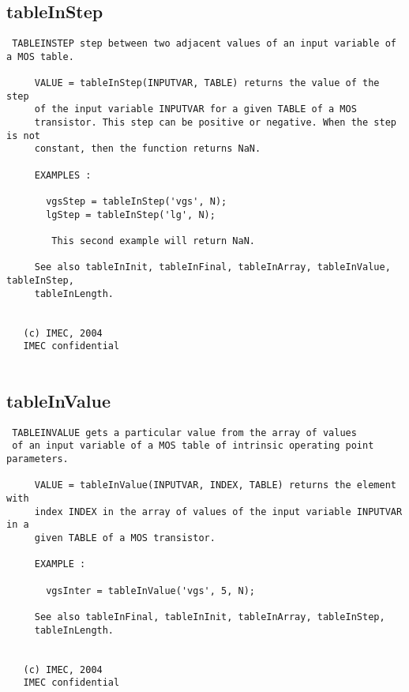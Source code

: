 \subsection{tableInStep}
\label{sec:tableInStep}
\begin{verbatim}
 TABLEINSTEP step between two adjacent values of an input variable of a MOS table.
 
     VALUE = tableInStep(INPUTVAR, TABLE) returns the value of the step
     of the input variable INPUTVAR for a given TABLE of a MOS
     transistor. This step can be positive or negative. When the step is not
     constant, then the function returns NaN.
 
     EXAMPLES :
 
       vgsStep = tableInStep('vgs', N);
       lgStep = tableInStep('lg', N);
 
        This second example will return NaN.
 
     See also tableInInit, tableInFinal, tableInArray, tableInValue, tableInStep,
     tableInLength.
 
 
   (c) IMEC, 2004
   IMEC confidential 
 

\end{verbatim}

\newpage
\subsection{tableInValue}
\label{sec:tableInValue}
\begin{verbatim}
 TABLEINVALUE gets a particular value from the array of values 
 of an input variable of a MOS table of intrinsic operating point parameters.
 
     VALUE = tableInValue(INPUTVAR, INDEX, TABLE) returns the element with
     index INDEX in the array of values of the input variable INPUTVAR in a
     given TABLE of a MOS transistor.
 
     EXAMPLE :
 
       vgsInter = tableInValue('vgs', 5, N);
 
     See also tableInFinal, tableInInit, tableInArray, tableInStep,
     tableInLength.
 
 
   (c) IMEC, 2004
   IMEC confidential 
 

\end{verbatim}

\newpage
